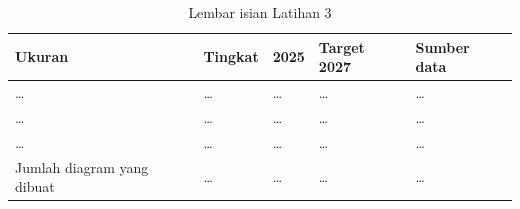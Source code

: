 \begin{table}[!htb]
  \centering
  \caption{Lembar isian Latihan 3}
  \label{tab:ch14-lat3-hasil}
  \small
  \begin{tabularx}{\textwidth}{>{\raggedright\arraybackslash}X>{\raggedright\arraybackslash}p{1.8cm}>{\raggedright\arraybackslash}p{1.4cm}>{\raggedright\arraybackslash}p{1.4cm}>{\raggedright\arraybackslash}p{2.2cm}}
    \hline
    \textbf{Ukuran} & \textbf{Tingkat} & \textbf{2025} & \textbf{Target 2027} &
      \textbf{Sumber data} \\
    \hline
    \dots & \dots & \dots & \dots & \dots \\
    \hline
    \dots & \dots & \dots & \dots & \dots \\
    \hline
    \dots & \dots & \dots & \dots & \dots \\
    \hline
    Jumlah diagram yang dibuat & \dots & \dots & \dots & \dots \\
    \hline
  \end{tabularx}
\end{table}
